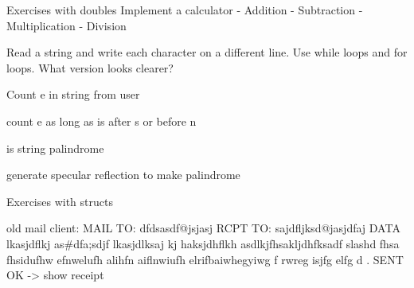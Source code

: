 Exercises with doubles
  Implement a calculator
    - Addition
    - Subtraction
    - Multiplication
    - Division


Read a string and write each character on a different line. Use while
loops and for loops. What version looks clearer?

Count e in string from user

count e as long as is after s or before n

is string palindrome

generate specular reflection to make palindrome


Exercises with structs
   

old mail client: 
  MAIL TO: dfdsasdf@jsjasj
  RCPT TO: sajdfljksd@jasjdfaj
  DATA
   lkasjdflkj as#dfa;sdjf lkasjdlksaj kj haksjdhflkh
   asdlkjfhsakljdhfksadf slashd fhsa fhsidufhw efnwelufh alihfn
   aiflnwiufh elrifbaiwhegyiwg f rwreg
   isjfg elfg d
   .
  SENT OK -> show receipt